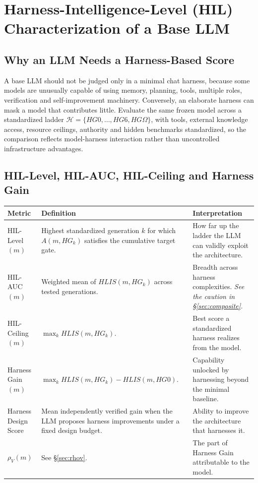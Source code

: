 \documentclass[11pt]{article}
\theoremstyle{definition}
\newcommand{\Om}{\ensuremath{\Omega}}
\newcommand{\rhov}{\ensuremath{\rho_V}}
\begin{document}
\section{Harness-Intelligence-Level (HIL) Characterization of a Base LLM}

\subsection{Why an LLM Needs a Harness-Based Score}

A base LLM should not be judged only in a minimal chat harness, because some models are unusually capable of using memory, planning, tools, multiple roles, verification and self-improvement machinery. Conversely, an elaborate harness can mask a model that contributes little. Evaluate the same frozen model across a standardized ladder $\mathcal{H} = \{HG0, \ldots, HG6, HG\Om{}\}$, with tools, external knowledge access, resource ceilings, authority and hidden benchmarks standardized, so the comparison reflects model-harness interaction rather than uncontrolled infrastructure advantages.

\subsection{HIL-Level, HIL-AUC, HIL-Ceiling and Harness Gain}

\begin{table}[h]
\centering\small
\begin{tabularx}{\textwidth}{@{}lYY@{}}
\toprule
Metric & Definition & Interpretation \\
\midrule
HIL-Level$(m)$ & Highest standardized generation $k$ for which $A(m,HG_k)$ satisfies the cumulative target gate. & How far up the ladder the LLM can validly exploit the architecture. \\
HIL-AUC$(m)$ & Weighted mean of $HLIS(m,HG_k)$ across tested generations. & Breadth across harness complexities. \emph{See the caution in \S\ref{sec:composite}.} \\
HIL-Ceiling$(m)$ & $\max_k HLIS(m,HG_k)$. & Best score a standardized harness realizes from the model. \\
Harness Gain$(m)$ & $\max_k HLIS(m,HG_k) - HLIS(m,HG0)$. & Capability unlocked by harnessing beyond the minimal baseline. \\
Harness Design Score & Mean independently verified gain when the LLM proposes harness improvements under a fixed design budget. & Ability to improve the architecture that harnesses it. \\
\textbf{$\rhov{}(m)$} & See \S\ref{sec:rhov}. & The part of Harness Gain attributable to the model. \\
\bottomrule
\end{tabularx}
\end{table}
\end{document}
